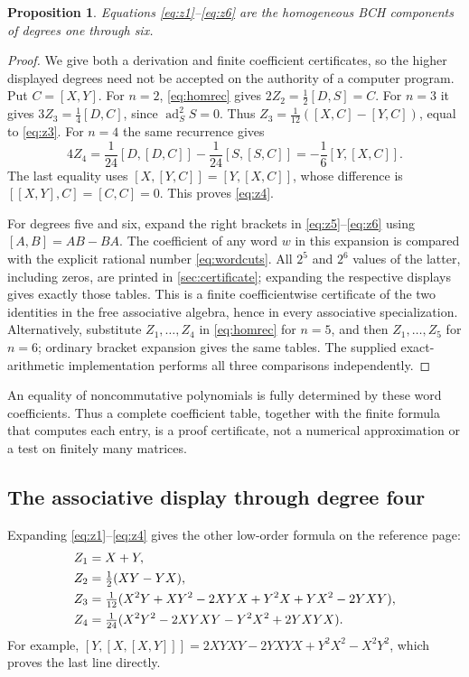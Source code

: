 \documentclass[11pt]{article}
\numberwithin{equation}{section}
\newtheorem{proposition}[proposition]{Proposition}
\theoremstyle{definition}
\theoremstyle{remark}
\DeclareMathOperator{\ad}{ad}
\begin{document}
\begin{proposition}
Equations \eqref{eq:z1}--\eqref{eq:z6} are the homogeneous BCH
components of degrees one through six.
\end{proposition}
\begin{proof}
We give both a derivation and finite coefficient certificates, so the
higher displayed degrees need not be accepted on the authority of a
computer program. Put $C=[X,Y]$. For $n=2$, \eqref{eq:homrec} gives
$2Z_2=\frac12[D,S]=C$. For $n=3$ it gives
$3Z_3=\frac14[D,C]$, since $\ad_S^2 S=0$. Thus
$Z_3=\frac1{12}([X,C]-[Y,C])$, equal to \eqref{eq:z3}.
For $n=4$ the same recurrence gives
\[
 4Z_4=\frac1{24}[D,[D,C]]-\frac1{24}[S,[S,C]]
       =-\frac16[Y,[X,C]].
\]
The last equality uses $[X,[Y,C]]=[Y,[X,C]]$, whose difference is
$[[X,Y],C]=[C,C]=0$. This proves \eqref{eq:z4}.

For degrees five and six, expand the right brackets in
\eqref{eq:z5}--\eqref{eq:z6} using $[A,B]=AB-BA$. The coefficient of
any word $w$ in this expansion is compared with the explicit rational
number \eqref{eq:wordcuts}. All $2^5$ and $2^6$ values of the latter,
including zeros, are printed in \cref{sec:certificate}; expanding the
respective displays gives exactly those tables. This is a finite
coefficientwise certificate of the two identities in the free
associative algebra, hence in every associative specialization.
Alternatively, substitute $Z_1,\ldots,Z_4$ in \eqref{eq:homrec} for
$n=5$, and then $Z_1,\ldots,Z_5$ for $n=6$; ordinary bracket
expansion gives the same tables. The supplied exact-arithmetic
implementation performs all three comparisons independently.
\end{proof}
An equality of noncommutative polynomials is fully determined by these
word coefficients. Thus a complete coefficient table, together with
the finite formula that computes each entry, is a proof certificate,
not a numerical approximation or a test on finitely many matrices.

\subsection{The associative display through degree four}
Expanding \eqref{eq:z1}--\eqref{eq:z4} gives the other low-order
formula on the reference page:
\begin{align}
 Z_1={}&X+Y,\notag\\
 Z_2={}&\tfrac12(XY-YX),\notag\\
 Z_3={}&\tfrac1{12}(X^2Y+XY^2-2XYX+Y^2X+YX^2-2YXY),
       \label{eq:assoclow}\\
 Z_4={}&\tfrac1{24}(X^2Y^2-2XYXY-Y^2X^2+2YXYX).\notag
\end{align}
For example,
$[Y,[X,[X,Y]]]=2XYXY-2YXYX+Y^2X^2-X^2Y^2$,
which proves the last line directly.
\end{document}

